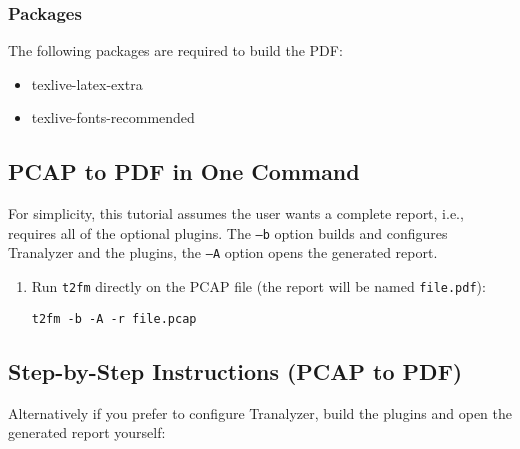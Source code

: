 \documentclass[documentation]{subfiles}
\begin{document}
    \subsubsection{Packages}
        The following packages are required to build the PDF:
        \begin{multicols}{3}
            \begin{itemize}
                \item texlive-latex-extra
                \item texlive-fonts-recommended
            \end{itemize}
        \end{multicols}

\subsection{PCAP to PDF in One Command}

For simplicity, this tutorial assumes the user wants a complete report, i.e., requires all of the optional plugins.
The {\tt --b} option builds and configures Tranalyzer and the plugins, the {\tt --A} option opens the generated report.

\begin{enumerate}
    \item Run {\tt t2fm} directly on the PCAP file (the report will be named {\tt file.pdf}):
        \begin{center}
            {\tt t2fm -b -A -r file.pcap}
        \end{center}
\end{enumerate}

\subsection{Step-by-Step Instructions (PCAP to PDF)}\label{t2fm-pcap-pdf}

Alternatively if you prefer to configure Tranalyzer, build the plugins and open the generated report yourself:
\end{document}
